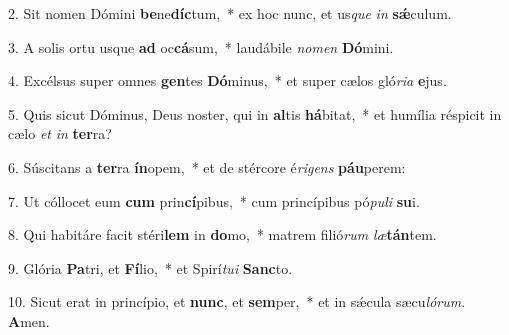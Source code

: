2. Sit nomen Dómini \textbf{be}ne\textbf{díc}tum,~*  ex hoc nunc, et us\textit{que} \textit{in} \textbf{sǽ}culum.\

3. A solis ortu usque \textbf{ad} oc\textbf{cá}sum,~*  laudábile \textit{no}\textit{men} \textbf{Dó}mini.\

4. Excélsus super omnes \textbf{gen}tes \textbf{Dó}minus,~*  et super cælos gló\textit{ri}\textit{a} \textbf{e}jus.\

5. Quis sicut Dóminus, Deus noster, qui in \textbf{al}tis \textbf{há}bitat,~*  et humília réspicit in cælo \textit{et} \textit{in} \textbf{ter}ra?\

6. Súscitans a \textbf{ter}ra \textbf{ín}opem,~*  et de stércore é\textit{ri}\textit{gens} \textbf{páu}perem:\

7. Ut cóllocet eum \textbf{cum} prin\textbf{cí}pibus,~*  cum princípibus pó\textit{pu}\textit{li} \textbf{su}i.\

8. Qui habitáre facit stéri\textbf{lem} in \textbf{do}mo,~*  matrem filió\textit{rum} \textit{læ}\textbf{tán}tem.\

9. Glória \textbf{Pa}tri, et \textbf{Fí}lio,~*  et Spirí\textit{tu}\textit{i} \textbf{Sanc}to.\

10. Sicut erat in princípio, et \textbf{nunc}, et \textbf{sem}per,~*  et in sǽcula sæcu\textit{ló}\textit{rum}. \textbf{A}men.\

